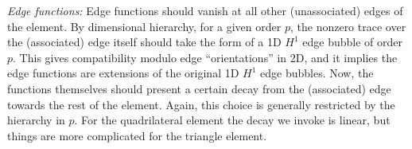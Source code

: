 \textit{Edge functions:}
Edge functions should vanish at all other (unassociated) edges of the element.
By dimensional hierarchy, for a given order $p$, the nonzero trace over the (associated) edge itself should take the form of a 1D $H^1$ edge bubble of order $p$.
This gives compatibility modulo edge ``orientations'' in 2D, and it implies the edge functions are extensions of the original 1D $H^1$ edge bubbles.
Now, the functions themselves should present a certain decay from the (associated) edge towards the rest of the element.
Again, this choice is generally restricted by the hierarchy in $p$.
For the quadrilateral element the decay we invoke is linear, but things are more complicated for the triangle element. %

